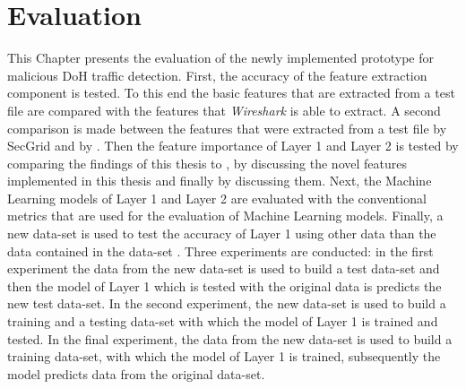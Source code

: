 \chapter{Evaluation} \label{evaluation}
This Chapter presents the evaluation of the newly implemented prototype for malicious DoH traffic detection. First, the accuracy of the feature extraction component is tested. To this end the basic features that are extracted from a test file are compared with the features that \textit{Wireshark} is able to extract. A second comparison is made between the features that were extracted from a test file by SecGrid and by \cite{DoHlyzer}. Then the feature importance of Layer 1 and Layer 2 is tested by comparing the findings of this thesis to \cite{BehnkeEtAl_FeatureEngineeringMLModelMaliciusDoHTraffic}, by discussing the novel features implemented in this thesis and finally by discussing them. Next, the Machine Learning models of Layer 1 and Layer 2 are evaluated with the conventional metrics that are used for the evaluation of Machine Learning models. Finally, a new data-set is used to test the accuracy of Layer 1 using other data than the data contained in the data-set \cite{CIRA-CIC-DoHBrw-2020}. Three experiments are conducted: in the first experiment the data from the new data-set is used to build a test data-set and then the model of Layer 1 which is tested with the original data is predicts the new test data-set. In the second experiment, the new data-set is used to build a training and a testing data-set with which the model of Layer 1 is trained and tested. In the final experiment, the data from the new data-set is used to build a training data-set, with which the model of Layer 1 is trained, subsequently the model predicts data from the original data-set.

